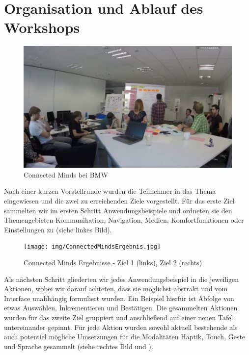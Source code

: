 \section[Ablauf]{Organisation und Ablauf des Workshops}
\begin{figure}[ht]
  \centering
  \includegraphics[width=1\textwidth]{img/ConnectedMind.jpg}
  \caption{Connected Minds bei BMW}
  \label{fig:ConnectedMind}
\end{figure} 
Nach einer kurzen Vorstellrunde wurden die Teilnehmer in das Thema eingewiesen und die zwei zu erreichenden Ziele vorgestellt. 
Für das erste Ziel sammelten wir im ersten Schritt Anwendungsbeispiele und ordneten sie den Themengebieten Kommunikation, Navigation, Medien, Komfortfunktionen oder Einstellungen zu (siehe  linkes Bild).
\begin{figure}[ht]
  \centering
  \texttt{[image: img/ConnectedMindsErgebnis.jpg]}
  \caption[Connected Minds Ergebnisse]{Connected Minds Ergebnisse - Ziel 1 (links), Ziel 2 (rechts)}
  \label{fig:ConnectedMindErgebnisse}
\end{figure}  

Als nächsten Schritt gliederten wir jedes Anwendungsbeispiel in die jeweiligen Aktionen, wobei wir darauf achteten, dass sie möglichst abstrakt und vom Interface unabhängig formuliert wurden. 
Ein Beispiel hierfür ist Abfolge von etwas Auswählen, Inkrementieren und Bestätigen. 
Die gesammelten Aktionen wurden für das zweite Ziel gruppiert und anschließend auf einer neuen Tafel untereinander gepinnt. 
Für jede Aktion wurden sowohl aktuell bestehende als auch potentiel mögliche Umsetzungen für die Modalitäten Haptik, Touch, Geste und Sprache gesammelt (siehe  rechtes Bild und ). 

